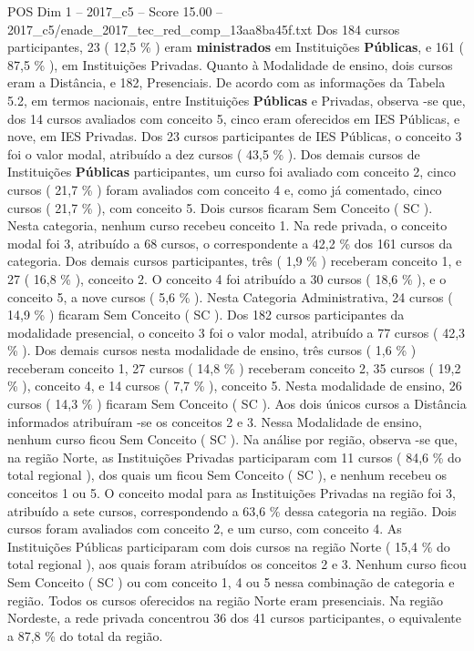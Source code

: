 \begin{textsample}{POS Dim 1 – 2017\_c5 – Score 15.00 – 2017\_c5/enade\_2017\_tec\_red\_comp\_13aa8ba45f.txt}
Dos 184 cursos participantes, 23 ( 12,5 \% ) eram \textbf{ministrados} em Instituições \textbf{Públicas}, e 161 ( 87,5 \% ), em Instituições Privadas.
Quanto à Modalidade de ensino, dois cursos eram a Distância, e 182, Presenciais.
De acordo com as informações da Tabela 5.2, em termos nacionais, entre Instituições \textbf{Públicas} e Privadas, observa -se que, dos 14 cursos avaliados com conceito 5, cinco eram oferecidos em IES Públicas, e nove, em IES Privadas.
Dos 23 cursos participantes de IES Públicas, o conceito 3 foi o valor modal, atribuído a dez cursos ( 43,5 \% ).
Dos demais cursos de Instituições \textbf{Públicas} participantes, um curso foi avaliado com conceito 2, cinco cursos ( 21,7 \% ) foram avaliados com conceito 4 e, como já comentado, cinco cursos ( 21,7 \% ), com conceito 5.
Dois cursos ficaram Sem Conceito ( SC ).
Nesta categoria, nenhum curso recebeu conceito 1.
Na rede privada, o conceito modal foi 3, atribuído a 68 cursos, o correspondente a 42,2 \% dos 161 cursos da categoria.
Dos demais cursos participantes, três ( 1,9 \% ) receberam conceito 1, e 27 ( 16,8 \% ), conceito 2.
O conceito 4 foi atribuído a 30 cursos ( 18,6 \% ), e o conceito 5, a nove cursos ( 5,6 \% ).
Nesta Categoria Administrativa, 24 cursos ( 14,9 \% ) ficaram Sem Conceito ( SC ).
Dos 182 cursos participantes da modalidade presencial, o conceito 3 foi o valor modal, atribuído a 77 cursos ( 42,3 \% ).
Dos demais cursos nesta modalidade de ensino, três cursos ( 1,6 \% ) receberam conceito 1, 27 cursos ( 14,8 \% ) receberam conceito 2, 35 cursos ( 19,2 \% ), conceito 4, e 14 cursos ( 7,7 \% ), conceito 5.
Nesta modalidade de ensino, 26 cursos ( 14,3 \% ) ficaram Sem Conceito ( SC ).
Aos dois únicos cursos a Distância informados atribuíram -se os conceitos 2 e 3.
Nessa Modalidade de ensino, nenhum curso ficou Sem Conceito ( SC ).
Na análise por região, observa -se que, na região Norte, as Instituições Privadas participaram com 11 cursos ( 84,6 \% do total regional ), dos quais um ficou Sem Conceito ( SC ), e nenhum recebeu os conceitos 1 ou 5.
O conceito modal para as Instituições Privadas na região foi 3, atribuído a sete cursos, correspondendo a 63,6 \% dessa categoria na região.
Dois cursos foram avaliados com conceito 2, e um curso, com conceito 4.
As Instituições Públicas participaram com dois cursos na região Norte ( 15,4 \% do total regional ), aos quais foram atribuídos os conceitos 2 e 3.
Nenhum curso ficou Sem Conceito ( SC ) ou com conceito 1, 4 ou 5 nessa combinação de categoria e região.
Todos os cursos oferecidos na região Norte eram presenciais.
Na região Nordeste, a rede privada concentrou 36 dos 41 cursos participantes, o equivalente a 87,8 \% do total da região.

\end{textsample}
